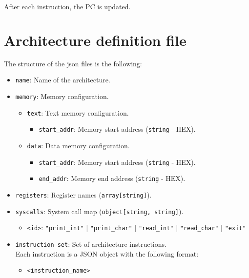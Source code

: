 After each instruction, the PC is updated.



\section*{Architecture definition file}
The structure of the \gls{json} files is the following:
\begin{itemize}[nosep,noitemsep]
  \item \texttt{name}: Name of the architecture.
  \item \texttt{memory}: Memory configuration.
    \begin{itemize}[nosep,noitemsep]
      \item \texttt{text}: Text memory configuration.
        \begin{itemize}[nosep,noitemsep]
          \item \texttt{start\_addr}: Memory start address (\texttt{string} - HEX).
        \end{itemize}
      \item \texttt{data}: Data memory configuration.
        \begin{itemize}[nosep,noitemsep]
          \item \texttt{start\_addr}: Memory start address (\texttt{string} - HEX).
          \item \texttt{end\_addr}: Memory end address (\texttt{string} - HEX).
        \end{itemize}
    \end{itemize}
  \item \texttt{registers}: Register names (\texttt{array[string]}).
  \item \texttt{syscalls}: System call map (\texttt{object[string, string]}).
    \begin{itemize}[nosep,noitemsep]
      \item \texttt{<id>}: \texttt{"print\_int"} | \texttt{"print\_char"} | \texttt{"read\_int"} | \texttt{"read\_char"} | \texttt{"exit"}
    \end{itemize}
  \item \texttt{instruction\_set}: Set of architecture instructions.\\
    Each instruction is a JSON object with the following format:
    \begin{itemize}[nosep,noitemsep]
      \item \texttt{<instruction\_name>}
      \begin{itemize}

\end{itemize}
\end{itemize}
\end{itemize}
